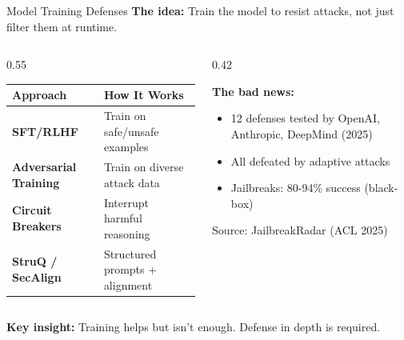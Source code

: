 \documentclass[aspectratio=169,9pt]{beamer}
\begin{document}
\begin{frame}{Model Training Defenses}
\textbf{The idea:} Train the model to resist attacks, not just filter them at runtime.

\vspace{0.5em}
\begin{columns}[T]
\begin{column}{0.55\textwidth}
\small
\begin{tabular}{p{2.8cm}|p{4.2cm}}
\toprule
\textbf{Approach} & \textbf{How It Works} \\
\midrule
\textbf{SFT/RLHF} & Train on safe/unsafe examples \\
\textbf{Adversarial Training} & Train on diverse attack data \\
\textbf{Circuit Breakers} & Interrupt harmful reasoning \\
\textbf{StruQ / SecAlign} & Structured prompts + alignment \\
\bottomrule
\end{tabular}
\end{column}

\begin{column}{0.42\textwidth}
\begin{redbox}
\textbf{The bad news:}
\begin{itemize}\small
  \item 12 defenses tested by OpenAI, Anthropic, DeepMind (2025)
  \item All defeated by adaptive attacks
  \item Jailbreaks: 80-94\% success (black-box)
\end{itemize}
{\tiny Source: JailbreakRadar (ACL 2025)}
\end{redbox}
\end{column}
\end{columns}

\vspace{0.5em}
\begin{graybox}
\textbf{Key insight:} Training helps but isn't enough. Defense in depth is required.
\end{graybox}
\end{frame}
\end{document}

